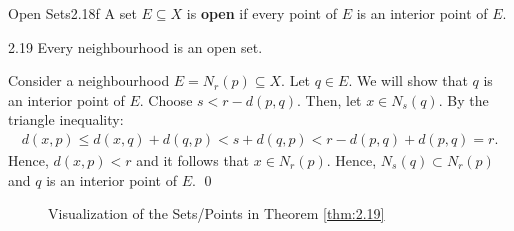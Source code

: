 \newpage 
\setcounter{rudin}{17}
\begin{definition}{Open Sets}{2.18f}
    A set $E \subseteq X$ is \textbf{open} if every point of $E$ is an interior point of $E$. 
\end{definition}

\begin{theorem}{}{2.19}
    Every neighbourhood is an open set.
\end{theorem}
\begin{nproof}
    Consider a neighbourhood $E = N_r(p) \subseteq X$. Let $q \in E$. We will show that $q$ is an interior point of $E$. Choose $s < r - d(p, q)$. Then, let $x \in N_s(q)$. By the triangle inequality:
    \begin{align*}
        d(x, p) \leq d(x, q) + d(q, p) < s + d(q, p) < r - d(p, q) + d(p, q) = r.
    \end{align*}
    Hence, $d(x, p) < r$ and it follows that $x \in N_r(p)$. Hence, $N_s(q) \subset N_r(p)$ and $q$ is an interior point of $E$. \qed
\end{nproof}

\begin{figure}[htbp]
    \centering
    \caption{Visualization of the Sets/Points in Theorem \ref{thm:2.19}}
    \label{fig7}
\end{figure}

